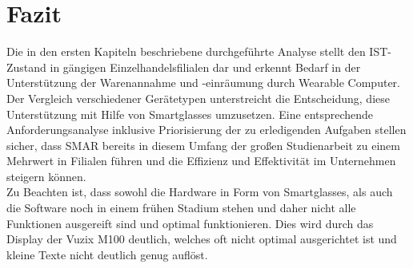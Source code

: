 
\chapter{Fazit}
Die in den ersten Kapiteln beschriebene durchgeführte Analyse stellt den IST-Zustand in gängigen Einzelhandelsfilialen dar und erkennt Bedarf in der Unterstützung der Warenannahme und -einräumung durch Wearable Computer. Der Vergleich verschiedener Gerätetypen unterstreicht die Entscheidung, diese Unterstützung mit Hilfe von Smartglasses umzusetzen. Eine entsprechende Anforderungsanalyse inklusive Priorisierung der zu erledigenden Aufgaben stellen sicher, dass \ac{SMAR} bereits in diesem Umfang der großen Studienarbeit zu einem Mehrwert in Filialen führen und die Effizienz und Effektivität im Unternehmen steigern können.\\

Zu Beachten ist, dass sowohl die Hardware in Form von Smartglasses, als auch die Software noch in einem frühen Stadium stehen und daher nicht alle Funktionen ausgereift sind und optimal funktionieren. Dies wird \zB durch das Display der Vuzix M100 deutlich, welches oft nicht optimal ausgerichtet ist und kleine Texte nicht deutlich genug auflöst.\\

